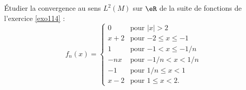 

\begin{exercice}\label{exo_I-4-1}

Étudier la convergence au sens $ L^2(M)$ sur $\eR$ de la suite de fonctions de l'exercice \ref{exo114} :
\begin{equation}
f_n(x)=
	\begin{cases}
	0	&	\text{pour $| x |>2$}\\
	x+2	&	\text{pour $-2\leq x\leq -1$}\\
	1	&	\text{pour $-1<x\leq -1/n$}\\
	-nx	&	\text{pour $-1/n<x<1/n$}\\
	-1	&	\text{pour $1/n\leq x<1$}\\
	x-2	&	 \text{pour $1\leq x<2$.}
\end{cases}
\end{equation}

\end{exercice}
